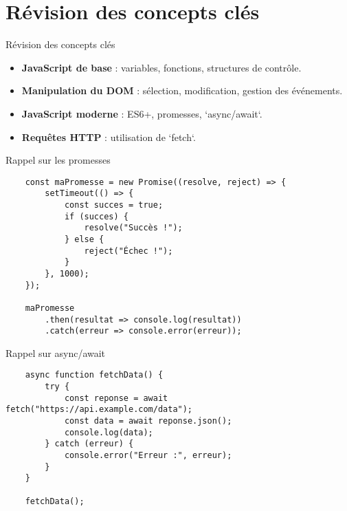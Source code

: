 \documentclass{beamer}
\begin{document}
    \section{Révision des concepts clés}
    \begin{frame}{Révision des concepts clés}
    \begin{itemize}
        \item \textbf{JavaScript de base} : variables, fonctions, structures de contrôle.
        \item \textbf{Manipulation du DOM} : sélection, modification, gestion des événements.
        \item \textbf{JavaScript moderne} : ES6+, promesses, `async/await`.
        \item \textbf{Requêtes HTTP} : utilisation de `fetch`.
    \end{itemize}
    \end{frame}
    
    \begin{frame}[fragile]{Rappel sur les promesses}
    \begin{verbatim}
    const maPromesse = new Promise((resolve, reject) => {
        setTimeout(() => {
            const succes = true;
            if (succes) {
                resolve("Succès !");
            } else {
                reject("Échec !");
            }
        }, 1000);
    });
    
    maPromesse
        .then(resultat => console.log(resultat))
        .catch(erreur => console.error(erreur));
    \end{verbatim}
    \end{frame}
    
    \begin{frame}[fragile]{Rappel sur async/await}
    \begin{verbatim}
    async function fetchData() {
        try {
            const reponse = await fetch("https://api.example.com/data");
            const data = await reponse.json();
            console.log(data);
        } catch (erreur) {
            console.error("Erreur :", erreur);
        }
    }
    
    fetchData();
    \end{verbatim}
    \end{frame}
    
\end{document}
